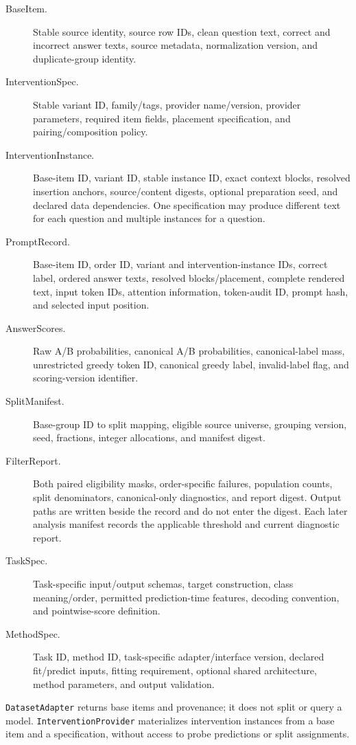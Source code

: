 \documentclass[11pt]{article}
\begin{document}
\begin{description}
\item[BaseItem.] Stable source identity, source row IDs, clean question text, correct and incorrect answer texts, source metadata, normalization version, and duplicate-group identity.
\item[InterventionSpec.] Stable variant ID, family/tags, provider name/version, provider parameters, required item fields, placement specification, and pairing/composition policy.
\item[InterventionInstance.] Base-item ID, variant ID, stable instance ID, exact context blocks, resolved insertion anchors, source/content digests, optional preparation seed, and declared data dependencies.
One specification may produce different text for each question and multiple instances for a question.
\item[PromptRecord.] Base-item ID, order ID, variant and intervention-instance IDs, correct label, ordered answer texts, resolved blocks/placement, complete rendered text, input token IDs, attention information, token-audit ID, prompt hash, and selected input position.
\item[AnswerScores.] Raw A/B probabilities, canonical A/B probabilities, canonical-label mass, unrestricted greedy token ID, canonical greedy label, invalid-label flag, and scoring-version identifier.
\item[SplitManifest.] Base-group ID to split mapping, eligible source universe, grouping version, seed, fractions, integer allocations, and manifest digest.
\item[FilterReport.] Both paired eligibility masks, order-specific failures, population counts, split denominators, canonical-only diagnostics, and report digest. Output paths are written beside the record and do not enter the digest.
Each later analysis manifest records the applicable threshold and current diagnostic report.
\item[TaskSpec.] Task-specific input/output schemas, target construction, class meaning/order, permitted prediction-time features, decoding convention, and pointwise-score definition.
\item[MethodSpec.] Task ID, method ID, task-specific adapter/interface version, declared fit/predict inputs, fitting requirement, optional shared architecture, method parameters, and output validation.
\end{description}
\texttt{DatasetAdapter} returns base items and provenance; it does not split or query a model.
\texttt{InterventionProvider} materializes intervention instances from a base item and a specification, without access to probe predictions or split assignments.
\end{document}

